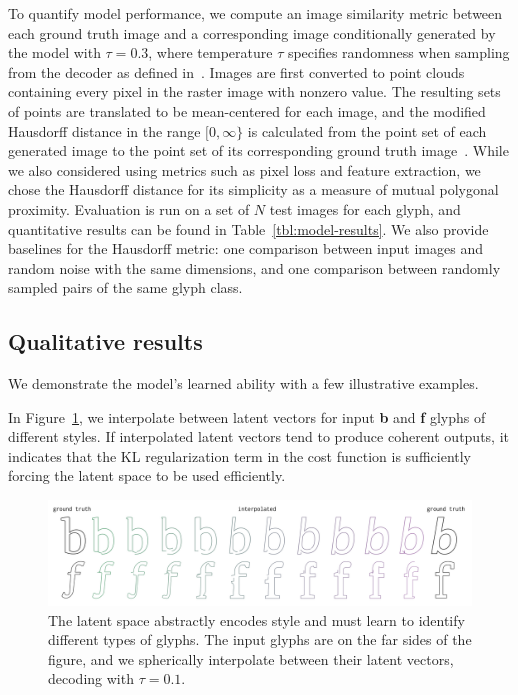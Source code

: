 To quantify model performance, we compute an image similarity metric between each ground truth image and a corresponding image conditionally generated by the model with $\tau = 0.3$, where temperature $\tau$ specifies randomness when sampling from the decoder as defined in~\cite{ha2017neural}.
Images are first converted to point clouds containing every pixel in the raster image with nonzero value.
The resulting sets of points are translated to be mean-centered for each image, and the modified Hausdorff distance in the range $[0, \infty\}$ is calculated from the point set of each generated image to the point set of its corresponding ground truth image~\cite{dubuisson1994modified}.
While we also considered using metrics such as pixel loss and feature extraction, we chose the Hausdorff distance for its simplicity as a measure of mutual polygonal proximity.
Evaluation is run on a set of $N$ test images for each glyph, and quantitative results can be found in Table~\ref{tbl:model-results}.
We also provide baselines for the Hausdorff metric: one comparison between input images and random noise with the same dimensions, and one comparison between randomly sampled pairs of the same glyph class.

\subsection{Qualitative results}
We demonstrate the model's learned ability with a few illustrative examples.

In Figure~\ref{fig:interp}, we interpolate between latent vectors for input \textbf{b} and \textbf{f} glyphs of different styles.
If interpolated latent vectors tend to produce coherent outputs, it indicates that the KL regularization term in the cost function is sufficiently forcing the latent space to be used efficiently.
\begin{figure}[h]
    \centering
	\includegraphics[width=\textwidth]{figures/interp}
    \caption[Latent space interpolation for the single-class model]
    {The latent space abstractly encodes style and must learn to identify different types of glyphs.
    The input glyphs are on the far sides of the figure, and we spherically interpolate between their latent vectors, decoding with $\tau=0.1$.\label{fig:interp}}
\end{figure}

